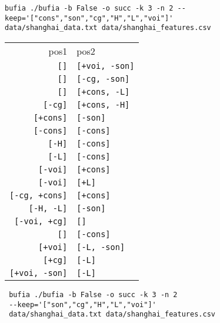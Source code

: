 \documentclass{article}
\begin{document}
\begin{verbatim}
bufia ./bufia -b False -o succ -k 3 -n 2 --
keep='["cons","son","cg","H","L","voi"]' 
data/shanghai_data.txt data/shanghai_features.csv
\end{verbatim}

\begin{tabular}{rl}
pos1&pos2\\
\texttt{[]}           & \texttt{[+voi, -son]} \\
\texttt{[]}           & \texttt{[-cg, -son]}  \\
\texttt{[]}           & \texttt{[+cons, -L]}  \\
\texttt{[-cg]}        & \texttt{[+cons, -H]}  \\
\texttt{[+cons]}      & \texttt{[-son]}       \\
\texttt{[-cons]}      & \texttt{[-cons]}      \\
\texttt{[-H]}         & \texttt{[-cons]}      \\
\texttt{[-L]}         & \texttt{[-cons]}      \\
\texttt{[-voi]}       & \texttt{[+cons]}      \\
\texttt{[-voi]}       & \texttt{[+L]}         \\
\texttt{[-cg, +cons]} & \texttt{[+cons]}      \\
\texttt{[-H, -L]}     & \texttt{[-son]}       \\
\texttt{[-voi, +cg]}  & \texttt{[]}           \\
\texttt{[]}           & \texttt{[-cons]}      \\
\texttt{[+voi]}       & \texttt{[-L, -son]}   \\
\texttt{[+cg]}        & \texttt{[-L]}         \\
\texttt{[+voi, -son]} & \texttt{[-L]}         \\
\end{tabular}
\begin{verbatim}
 bufia ./bufia -b False -o succ -k 3 -n 2 
 --keep='["son","cg","H","L","voi"]' 
 data/shanghai_data.txt data/shanghai_features.csv   
\end{verbatim}
\end{document}
